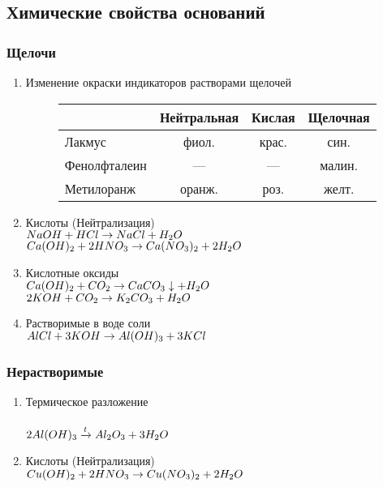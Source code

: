 \subsection{Химические свойства оснований}
\subsubsection{Щелочи}
\begin{enumerate}
    \item Изменение окраски индикаторов растворами щелочей
        \begin{figure*}[h!]
            \begin{tabular}[b]{| l | c | c | c |}
                \hline
                      & Нейтральная & Кислая & Щелочная \\
                \hline
                Лакмус & фиол. & крас. & син. \\
                \hline
                Фенолфталеин & --- & --- & малин. \\
                \hline
                Метилоранж & оранж. & роз. & желт. \\
                \hline
            \end{tabular}
        \end{figure*}

    \item Кислоты (Нейтрализация)\\
        $NaOH + HCl \rightarrow NaCl + H_2O$\\
        $Ca(OH)_2 + 2HNO_3 \rightarrow Ca(NO_3)_2 + 2H_2O$

    \item Кислотные оксиды\\
        $Ca(OH)_2 + CO_2 \rightarrow CaCO_3\downarrow + H_2O$\\
        $2KOH + CO_2 \rightarrow K_2CO_3 + H_2O$

    \item Растворимые в воде соли\\
        $AlCl + 3KOH \rightarrow Al(OH)_3 + 3KCl$

\end{enumerate}


\subsubsection{Нерастворимые}
\begin{enumerate}
    \item Термическое разложение\\
        \\
        $2Al(OH)_3 \xrightarrow{t} Al_2O_3 + 3H_2O$

    \item Кислоты (Нейтрализация)\\
        $Cu(OH)_2 + 2HNO_3 \rightarrow Cu(NO_3)_2 + 2H_2O$
\end{enumerate}
